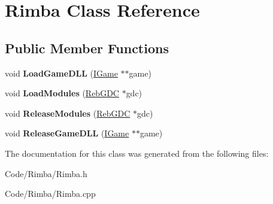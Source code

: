 \hypertarget{class_rimba}{}\section{Rimba Class Reference}
\label{class_rimba}
\subsection*{Public Member Functions}
\begin{DoxyCompactItemize}
\item 
void {\bfseries Load\+Game\+D\+LL} (\hyperlink{class_i_game}{I\+Game} $\ast$$\ast$game)\hypertarget{class_rimba_afac665403736bd804da9f11ce0e13d00}{}\label{class_rimba_afac665403736bd804da9f11ce0e13d00}

\item 
void {\bfseries Load\+Modules} (\hyperlink{class_reb_g_d_c}{Reb\+G\+DC} $\ast$gdc)\hypertarget{class_rimba_a82f3e2f85d70db2387831d5c15d01424}{}\label{class_rimba_a82f3e2f85d70db2387831d5c15d01424}

\item 
void {\bfseries Release\+Modules} (\hyperlink{class_reb_g_d_c}{Reb\+G\+DC} $\ast$gdc)\hypertarget{class_rimba_acb6b80c08bd55c4021d9281e5c1ffe50}{}\label{class_rimba_acb6b80c08bd55c4021d9281e5c1ffe50}

\item 
void {\bfseries Release\+Game\+D\+LL} (\hyperlink{class_i_game}{I\+Game} $\ast$$\ast$game)\hypertarget{class_rimba_a39f36e4686caa9c23ba3b14856db2803}{}\label{class_rimba_a39f36e4686caa9c23ba3b14856db2803}

\end{DoxyCompactItemize}


The documentation for this class was generated from the following files\+:\begin{DoxyCompactItemize}
\item 
Code/\+Rimba/Rimba.\+h\item 
Code/\+Rimba/Rimba.\+cpp\end{DoxyCompactItemize}
